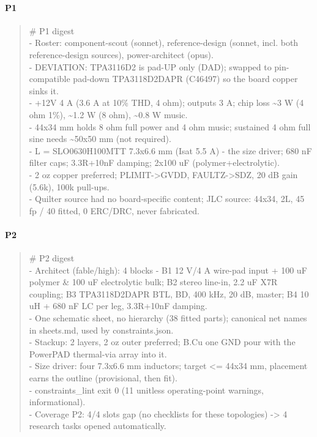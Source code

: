 \documentclass[11pt,a4paper]{article}
\begin{document}
\paragraph*{P1}
\begin{quote}\small\ttfamily\raggedright
\# P1 digest\\
- Roster: component-scout (sonnet), reference-design (sonnet, incl. both reference-design sources), power-architect (opus).\\
- DEVIATION: TPA3116D2 is pad-UP only (DAD); swapped to pin-compatible pad-down TPA3118D2DAPR (C46497) so the board copper sinks it.\\
- +12V 4 A (3.6 A at 10\% THD, 4 ohm); outputs 3 A; chip loss \textasciitilde{}3 W (4 ohm 1\%), \textasciitilde{}1.2 W (8 ohm), \textasciitilde{}0.8 W music.\\
- 44x34 mm holds 8 ohm full power and 4 ohm music; sustained 4 ohm full sine needs \textasciitilde{}50x50 mm (not required).\\
- L = SLO0630H100MTT 7.3x6.6 mm (Isat 5.5 A) - the size driver; 680 nF filter caps; 3.3R+10nF damping; 2x100 uF (polymer+electrolytic).\\
- 2 oz copper preferred; PLIMIT-\textgreater{}GVDD, FAULTZ-\textgreater{}SDZ, 20 dB gain (5.6k), 100k pull-ups.\\
- Quilter source had no board-specific content; JLC source: 44x34, 2L, 45 fp / 40 fitted, 0 ERC/DRC, never fabricated.
\end{quote}
\paragraph*{P2}
\begin{quote}\small\ttfamily\raggedright
\# P2 digest\\
- Architect (fable/high): 4 blocks - B1 12 V/4 A wire-pad input + 100 uF polymer \& 100 uF electrolytic bulk; B2 stereo line-in, 2.2 uF X7R coupling; B3 TPA3118D2DAPR BTL, BD, 400 kHz, 20 dB, master; B4 10 uH + 680 nF LC per leg, 3.3R+10nF damping.\\
- One schematic sheet, no hierarchy (38 fitted parts); canonical net names in sheets.md, used by constraints.json.\\
- Stackup: 2 layers, 2 oz outer preferred; B.Cu one GND pour with the PowerPAD thermal-via array into it.\\
- Size driver: four 7.3x6.6 mm inductors; target \textless{}= 44x34 mm, placement earns the outline (provisional, then fit).\\
- constraints\_lint exit 0 (11 unitless operating-point warnings, informational).\\
- Coverage P2: 4/4 slots gap (no checklists for these topologies) -\textgreater{} 4 research tasks opened automatically.
\end{quote}
\end{document}
